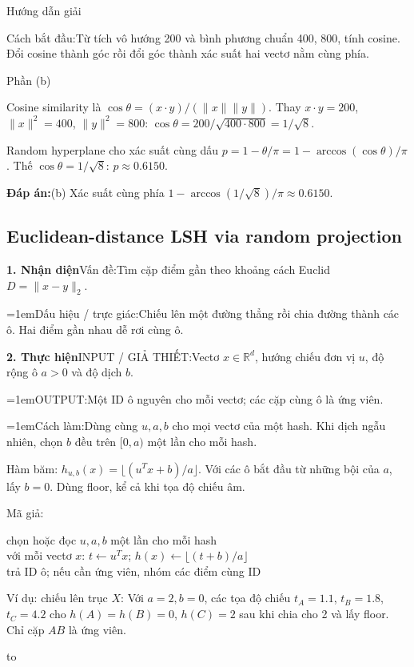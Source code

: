 \documentclass[10pt,a4paper,twocolumn]{article}
\makeatletter
\newcommand{\maptag}[1]{\phantomsection\@bsphack\protected@write\@auxout{}{\string\newlabel{#1}{{}{\thepage}{}{\@currentHref}{}}}\@esphack}
\newif\ifexamheadingprinted
\newcommand{\topic}[2]{%
  \global\examheadingprintedfalse\par\subsection{#2}\label{topic:#1}}
\newcommand{\key}[1]{#1:\enspace}
\newcommand{\solutionprompt}[1]{\par\addvspace{1pt}\noindent\key{Cách bắt đầu}#1\par\addvspace{2pt}}
\newcommand{\blocklabel}[1]{\par\noindent#1\par\nobreak}
\newcommand{\answer}[1]{%
  \par\addvspace{3pt}%
  \blocklabel{#1Hướng dẫn giải}}
\newcommand{\finalanswer}[1]{%
  \par\addvspace{3pt}\noindent\textbf{Đáp án:}\nobreak\enspace#1\par}
\newcommand{\guidepart}[1]{%
  \par\addvspace{1.5pt}%
  \blocklabel{Phần #1}}
\newenvironment{diagram}{%
  \par\addvspace{3pt}\noindent\hbox to \linewidth\bgroup\hfil
}{\hfil\egroup\par\addvspace{3pt}}
\newcommand{\algfield}[2]{\par\noindent\hangindent=1em\relax#1:\enspace#2}
\newcommand{\unitfield}[4]{%
  \par\noindent\textbf{#1. #2}\enspace #3:\enspace #4}
\newcommand{\algsummary}[6]{%
  \begingroup\setlength{\parskip}{1pt}%
  \unitfield{1}{Nhận diện}{Vấn đề}{#1}%
  \algfield{Dấu hiệu / trực giác}{#2}%
  \if\relax\detokenize{#3}\relax\else\par\noindent#3\par\fi%
  \unitfield{2}{Thực hiện}{INPUT / GIẢ THIẾT}{#4}%
  \algfield{OUTPUT}{#5}%
  \algfield{Cách làm}{#6}\par\endgroup}
\newenvironment{algpseudo}{%
  \par\addvspace{2pt}\noindent
  \setlength{\parskip}{0pt}%
  Mã giả:\par\nobreak
  \begin{list}{}{\setlength{\leftmargin}{1em}\setlength{\topsep}{0pt}%
    \setlength{\partopsep}{0pt}\setlength{\parsep}{0pt}%
    \@beginparpenalty=10000\relax}%
  \item\relax
}{\end{list}\par\addvspace{3pt}}
\makeatother
\begin{document}
\answer{\maptag{answer:P25-Q2b}}
\solutionprompt{Từ tích vô hướng 200 và bình phương chuẩn 400, 800, tính cosine. Đổi cosine thành góc rồi đổi góc thành xác suất hai vectơ nằm cùng phía.}
\guidepart{(b)}
\begin{guidesteps}
\item Cosine similarity là $\cos\theta=(x\cdot y)/(\|x\|\|y\|)$. Thay $x\cdot y=200$, $\|x\|^2=400$, $\|y\|^2=800$: $\cos\theta=200/\sqrt{400\cdot800}=1/\sqrt8$.
\item Random hyperplane cho xác suất cùng dấu $p=1-\theta/\pi=1-\arccos(\cos\theta)/\pi$. Thế $\cos\theta=1/\sqrt8$: $p\approx0.6150$.
\end{guidesteps}
\finalanswer{(b) Xác suất cùng phía $1-\arccos(1/\sqrt8)/\pi\approx0.6150$.}
\topic{euclidean}{Euclidean-distance LSH via random projection}

\algsummary{Tìm cặp điểm gần theo khoảng cách Euclid $D=\|x-y\|_2$.}{Chiếu lên một đường thẳng rồi chia đường thành các ô. Hai điểm gần nhau dễ rơi cùng ô.}{}{Vectơ $x\in\mathbb R^d$, hướng chiếu đơn vị $u$, độ rộng ô $a>0$ và độ dịch $b$.}{Một ID ô nguyên cho mỗi vectơ; các cặp cùng ô là ứng viên.}{Dùng cùng $u,a,b$ cho mọi vectơ của một hash. Khi dịch ngẫu nhiên, chọn $b$ đều trên $[0,a)$ một lần cho mỗi hash.}

\key{Hàm băm} $h_{u,b}(x)=\lfloor(u^Tx+b)/a\rfloor$. Với các ô bắt đầu từ những bội của $a$, lấy $b=0$. Dùng floor, kể cả khi tọa độ chiếu âm.

\begin{algpseudo}
chọn hoặc đọc $u,a,b$ một lần cho mỗi hash\\
với mỗi vectơ $x$: $t\gets u^Tx$; $h(x)\gets\lfloor(t+b)/a\rfloor$\\
trả ID ô; nếu cần ứng viên, nhóm các điểm cùng ID
\end{algpseudo}

\key{Ví dụ: chiếu lên trục $X$} Với $a=2,b=0$, các tọa độ chiếu $t_A=1.1$, $t_B=1.8$, $t_C=4.2$ cho $h(A)=h(B)=0$, $h(C)=2$ sau khi chia cho 2 và lấy floor. Chỉ cặp $AB$ là ứng viên.
\begin{diagram}
\end{diagram}
\end{document}
